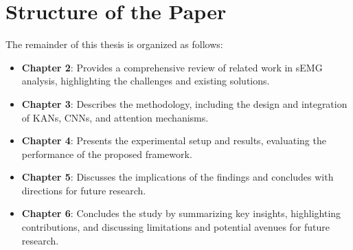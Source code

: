\section{Structure of the Paper}
The remainder of this thesis is organized as follows:
\begin{itemize}
    \item \textbf{Chapter 2}: Provides a comprehensive review of related work in sEMG analysis, highlighting the challenges and existing solutions.
    \item \textbf{Chapter 3}: Describes the methodology, including the design and integration of KANs, CNNs, and attention mechanisms.
    \item \textbf{Chapter 4}: Presents the experimental setup and results, evaluating the performance of the proposed framework.
    \item \textbf{Chapter 5}: Discusses the implications of the findings and concludes with directions for future research.
    \item \textbf{Chapter 6}: Concludes the study by summarizing key insights, highlighting contributions, and discussing limitations and potential avenues for future research.
\end{itemize}
